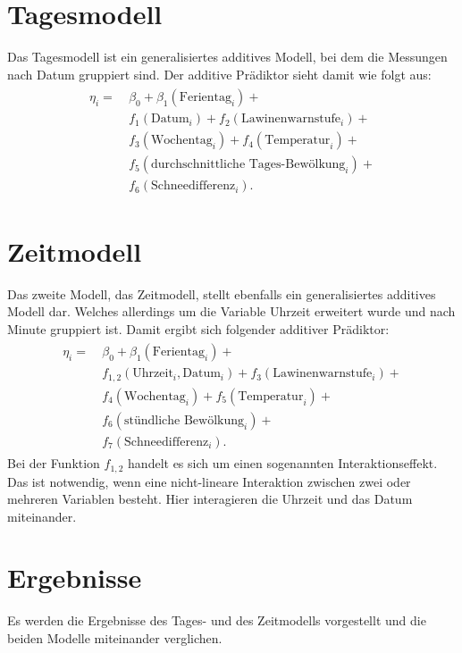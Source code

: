 \documentclass[12pt]{scrreprt}
\begin{document}
\section{Tagesmodell}
Das Tagesmodell ist ein generalisiertes additives Modell, bei dem die Messungen nach Datum gruppiert sind. Der additive Prädiktor sieht damit wie folgt aus:
\begin{align}
\begin{split}
\eta_{i}= ~ &\beta_{0}+\beta_{1}(\text{Ferientag}_{i})+ \\
&f_{1}(\text{Datum}_{i})+f_{2}(\text{Lawinenwarnstufe}_{i})+ \\
&f_{3}(\text{Wochentag}_{i})+ f_{4}(\text{Temperatur}_{i})+ \\ &f_{5}(\text{durchschnittliche Tages-Bewölkung}_{i})+ \\
&f_{6}(\text{Schneedifferenz}_{i}).
\end{split}
\end{align}

\section{Zeitmodell}
Das zweite Modell, das Zeitmodell, stellt ebenfalls ein generalisiertes additives Modell dar. Welches allerdings um die Variable Uhrzeit erweitert wurde und nach Minute gruppiert ist. Damit ergibt sich folgender additiver Prädiktor:
\begin{align}
\begin{split}
\eta_{i}= ~ &\beta_{0}+\beta_{1}(\text{Ferientag}_{i})+ \\
&f_{1,2}(\text{Uhrzeit}_{i},\text{Datum}_{i})+f_{3}(\text{Lawinenwarnstufe}_{i})+ \\
&f_{4}(\text{Wochentag}_{i})+f_{5}(\text{Temperatur}_{i})+ \\
&f_{6}(\text{stündliche Bewölkung}_{i})+ \\
&f_{7}(\text{Schneedifferenz}_{i}).
\end{split}
\end{align}
Bei der Funktion $f_{1,2}$ handelt es sich um einen sogenannten Interaktionseffekt. Das ist notwendig, wenn eine nicht-lineare Interaktion zwischen zwei oder mehreren Variablen besteht. Hier interagieren die Uhrzeit und das Datum miteinander.

\section{Ergebnisse}
Es werden die Ergebnisse des Tages- und des Zeitmodells vorgestellt und die beiden Modelle miteinander verglichen.
\end{document}
